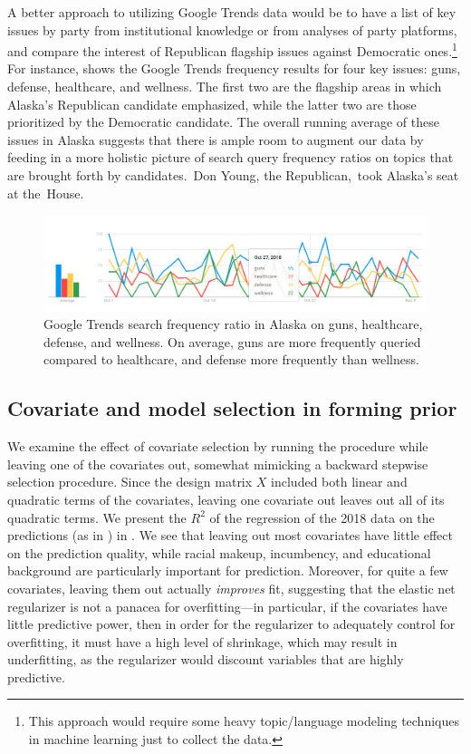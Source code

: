\documentclass[12pt]{article}
\begin{document}
A better approach to utilizing Google Trends data would be to have a list of key issues by party from institutional knowledge or from analyses of party platforms, and compare the interest of Republican flagship issues against Democratic ones.\footnote{This approach would require some heavy topic/language modeling techniques in machine learning just to collect the data.} For instance,  shows the Google Trends frequency results for four key issues: guns, defense, healthcare, and wellness. The first two are the flagship areas in which Alaska's Republican candidate emphasized, while the latter two are those prioritized by the Democratic candidate. The overall running average of these issues in Alaska suggests that there is ample room to augment our data by feeding in a more holistic picture of search query frequency ratios on topics that are brought forth by candidates.~Don Young, the Republican,~took Alaska's seat at the~House.

\begin{figure}[tb]
  \centering
  \includegraphics[scale=0.4]{trends_issues}
  \caption{Google Trends search frequency ratio in Alaska on guns, healthcare, defense, and wellness. On average, guns are more frequently queried compared to healthcare, and defense more frequently than wellness.}
  \label{fig:trends_issues}
\end{figure}

\subsection{Covariate and model selection in forming prior}

We examine the effect of covariate selection by running the procedure while
leaving one of the covariates out, somewhat mimicking a backward stepwise
selection procedure. Since the design matrix $X$ included both linear and
quadratic terms of the covariates, leaving one covariate out leaves out all of 
its
quadratic terms. We present the $R^2$ of the regression of the 2018 data on the
predictions (as in ) in . We see that
leaving out most covariates have little effect on the prediction quality, while
racial makeup, incumbency, and educational background are particularly important
for prediction. Moreover, for quite a few covariates, leaving them out actually
\emph{improves} fit, suggesting that the elastic net regularizer is not a
panacea for overfitting---in particular, if the covariates have little
predictive power, then in order for the regularizer to adequately control for
overfitting, it must have a high level of shrinkage, which may result in
underfitting, as the regularizer would discount variables that are highly
predictive.
\end{document}

